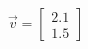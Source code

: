 \documentclass[preview]{standalone}
\begin{document}
\begin{align*}
\vec{v}=\begin{bmatrix}2.1\\1.5\end{bmatrix}
\end{align*}
\end{document}
